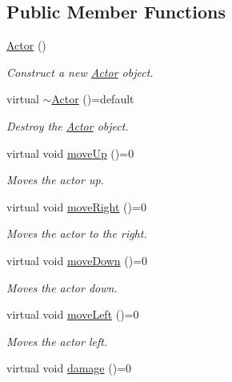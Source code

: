 \subsection*{Public Member Functions}
\begin{DoxyCompactItemize}
\item 
\mbox{\hyperlink{classRose_1_1Character_1_1Actor_a49b83c9e65da067866238127affa120a}{Actor}} ()
\begin{DoxyCompactList}\small\item\em Construct a new \mbox{\hyperlink{classRose_1_1Character_1_1Actor}{Actor}} object. \end{DoxyCompactList}\item 
virtual \mbox{\hyperlink{classRose_1_1Character_1_1Actor_ae8e15757a90d2195048964e6bbf8487b}{$\sim$\+Actor}} ()=default
\begin{DoxyCompactList}\small\item\em Destroy the \mbox{\hyperlink{classRose_1_1Character_1_1Actor}{Actor}} object. \end{DoxyCompactList}\item 
virtual void \mbox{\hyperlink{classRose_1_1Character_1_1Actor_afd7130be2654a3fa94122cf532de4b79}{move\+Up}} ()=0
\begin{DoxyCompactList}\small\item\em Moves the actor up. \end{DoxyCompactList}\item 
virtual void \mbox{\hyperlink{classRose_1_1Character_1_1Actor_a89ce0e5d1d6d25b1612867b982221dc9}{move\+Right}} ()=0
\begin{DoxyCompactList}\small\item\em Moves the actor to the right. \end{DoxyCompactList}\item 
virtual void \mbox{\hyperlink{classRose_1_1Character_1_1Actor_a3ccb744404ed29c77fe9420f274a6826}{move\+Down}} ()=0
\begin{DoxyCompactList}\small\item\em Moves the actor down. \end{DoxyCompactList}\item 
virtual void \mbox{\hyperlink{classRose_1_1Character_1_1Actor_a45191259db61cf46cb3d99bf186b48d3}{move\+Left}} ()=0
\begin{DoxyCompactList}\small\item\em Moves the actor left. \end{DoxyCompactList}\item 
virtual void \mbox{\hyperlink{classRose_1_1Character_1_1Actor_a8d835beb192c864967c7a9b3a5f7f579}{damage}} ()=0

\end{DoxyCompactItemize}
